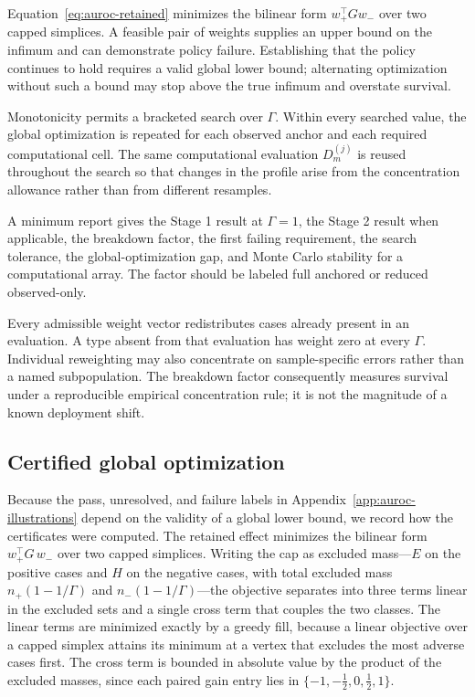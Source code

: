 \documentclass[11pt]{article}
\theoremstyle{remark}
\begin{document}
Equation~\eqref{eq:auroc-retained} minimizes the bilinear form
$w_+^\top G w_-$ over two capped simplices. A feasible pair of weights supplies
an upper bound on the infimum and can demonstrate policy failure. Establishing
that the policy continues to hold requires a valid global lower bound;
alternating optimization without such a bound may stop above the true infimum
and overstate survival.

Monotonicity permits a bracketed search over $\Gamma$. Within every searched
value, the global optimization is repeated for each observed anchor and each
required computational cell. The same computational evaluation $D_m^{(j)}$ is
reused throughout the search so that changes in the profile arise from the
concentration allowance rather than from different resamples.

A minimum report gives the Stage 1 result at $\Gamma=1$, the Stage 2 result
when applicable, the breakdown factor, the first failing requirement, the
search tolerance, the global-optimization gap, and Monte Carlo stability for a
computational array. The factor should be labeled full anchored or reduced
observed-only.

Every admissible weight vector redistributes cases already present in an
evaluation. A type absent from that evaluation has weight zero at every
$\Gamma$. Individual reweighting may also concentrate on sample-specific
errors rather than a named subpopulation. The breakdown factor consequently
measures survival under a reproducible empirical concentration rule; it is not
the magnitude of a known deployment shift.

\subsection{Certified global optimization}
\label{app:auroc-certification}

Because the pass, unresolved, and failure labels in
Appendix~\ref{app:auroc-illustrations} depend on the validity of a global lower
bound, we record how the certificates were computed. The retained effect
minimizes the bilinear form $w_+^\top G\,w_-$ over two capped simplices. Writing
the cap as excluded mass---$E$ on the positive cases and $H$ on the negative
cases, with total excluded mass $n_+(1-1/\Gamma)$ and $n_-(1-1/\Gamma)$---the
objective separates into three terms linear in the excluded sets and a single
cross term that couples the two classes. The linear terms are minimized exactly
by a greedy fill, because a linear objective over a capped simplex attains its
minimum at a vertex that excludes the most adverse cases first. The cross term
is bounded in absolute value by the product of the excluded masses, since each
paired gain entry lies in $\{-1,-\tfrac12,0,\tfrac12,1\}$.
\end{document}
